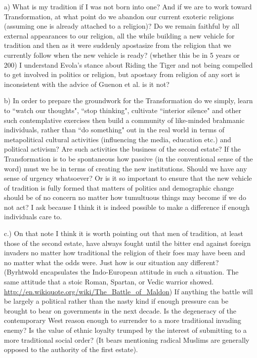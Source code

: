 \begin{footnotesize}
\begin{sffamily}
a) What is my tradition if I was not born into one? And if we are to work toward Transformation, at what point do we
abandon our current exoteric religions (assuming one is already attached to a religion)? Do we remain faithful by all
external appearances to our religion, all the while building a new vehicle for tradition and then as it were suddenly
apostasize from the religion that we currently follow when the new vehicle is ready? (whether this be in 5 years or
200) I understand Evola's stance about Riding the Tiger and not being compelled to get involved in
politics or religion, but apostasy from religion of any sort is inconsistent with the advice of Guenon et al. is it
not?

b) In order to prepare the groundwork for the Transformation do we simply, learn to ``watch our thoughts", ``stop
thinking", cultivate ``interior silence" and other such contemplative exercises then build a community of like-minded
brahmanic individuals, rather than ``do something" out in the real world in terms of metapolitical cultural activities
(influencing the media, education etc.) and political activism? Are such activities the business of the second estate?
If the Transformation is to be spontaneous how passive (in the conventional sense of the word) must we be in terms of
creating the new institutions. Should we have any sense of urgency whatsoever? Or is it so important to ensure that the
new vehicle of tradition is fully formed that matters of politics and demographic change should be of no concern no
matter how tumultuous things may become if we do not act? I ask because I think it is indeed possible to make a
difference if enough individuals care to.

c.) On that note I think it is worth pointing out that men of tradition, at least those of the second estate, have
always fought until the bitter end against foreign invaders no matter how traditional the religion of their foes may
have been and no matter what the odds were. Just how is our situation any different? (Byrhtwold encapsulates the
Indo-European attitude in such a situation. The same attitude that a stoic Roman, Spartan, or Vedic warrior showed.
\url{http://en.wikiquote.org/wiki/The\_Battle\_of\_Maldon}) If anything the battle will be largely a political rather than
the nasty kind if enough pressure can be brought to bear on governments in the next decade. Is the degeneracy of the
contemporary West reason enough to surrender to a more traditional invading enemy? Is the value of ethnic loyalty
trumped by the interest of submitting to a more traditional social order? (It bears mentioning radical Muslims are
generally opposed to the authority of the first estate).


\end{sffamily}
\end{footnotesize}
